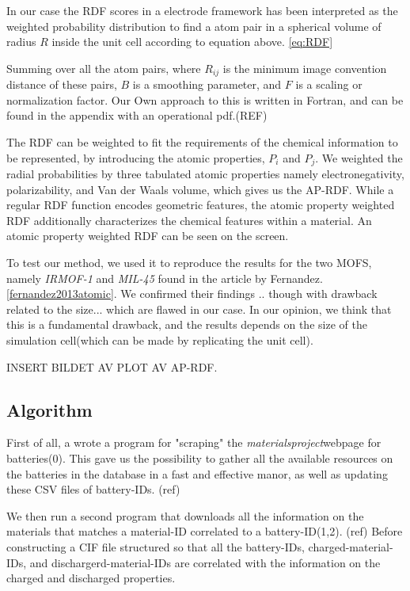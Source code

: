 In our case the RDF scores in a electrode framework has been interpreted as the weighted probability distribution to find a atom pair in a spherical volume of radius $R$ inside the unit cell according to equation above. \ref{eq:RDF}

Summing over all the atom pairs, where $R_{ij}$ is the minimum image convention distance of these pairs, $B$ is a smoothing parameter, and $F$ is a scaling or normalization factor. Our Own approach to this is written in Fortran, and can be found in the appendix with an operational pdf.(REF)

The RDF can be weighted to fit the requirements of the chemical information to be represented, by introducing the atomic properties, $P_i$ and $P_j$. We weighted the radial probabilities by three tabulated atomic properties namely electronegativity, polarizability, and Van der Waals volume, which gives us the AP-RDF. While a regular RDF function encodes geometric features, the atomic property weighted RDF additionally characterizes the chemical features within a material. An atomic property weighted RDF can be seen on the screen. 

To test our method, we used it to reproduce the results for the two MOFS, namely \textit{IRMOF-1} and \textit{MIL-45} found in the article by Fernandez.\ref{fernandez2013atomic}. We confirmed their findings .. though with drawback related to the size... which are flawed in our case.  In our opinion, we think that this is a fundamental drawback, and the results depends on the size of the simulation cell(which can be made by replicating the unit cell). 

INSERT BILDET AV PLOT AV AP-RDF. 

\subsection{Algorithm}

First of all, a wrote a program for "scraping" the \textit{materialsproject}webpage for batteries(0). This gave us the possibility to gather all the available resources on the batteries in the database in a fast and effective manor, as well as updating these CSV files of  battery-IDs. (ref)

We then run a second program that downloads all the information on the materials that matches a material-ID correlated to a battery-ID(1,2). (ref) Before constructing a CIF file structured so that all the battery-IDs, charged-material-IDs, and dischargerd-material-IDs are correlated with the information on the charged and discharged properties. 

